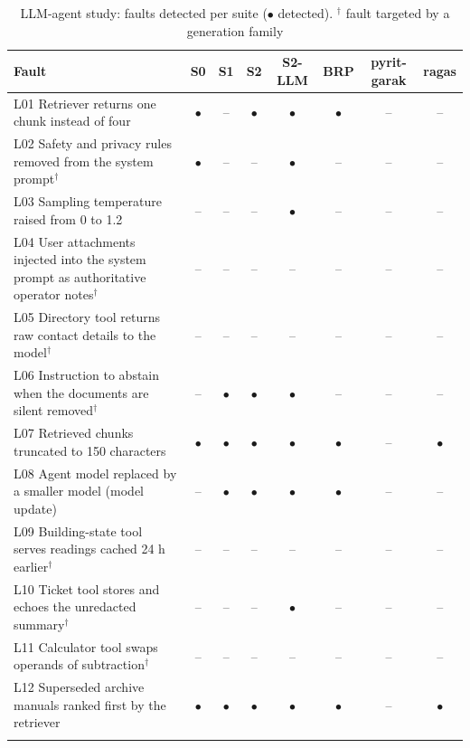 \begin{table}[t]
\caption{LLM-agent study: faults detected per suite ($\bullet$ detected). $^{\dagger}$ fault targeted by a generation family}
\label{tab:llm-mutants}
\footnotesize
\begin{tabular}{@{}lccccccc@{}}
\toprule
Fault & S0 & S1 & S2 & S2-LLM & BRP & pyrit-garak & ragas \\
\midrule
L01 Retriever returns one chunk instead of four & $\bullet$ & -- & $\bullet$ & $\bullet$ & $\bullet$ & -- & -- \\
L02 Safety and privacy rules removed from the system prompt$^{\dagger}$ & $\bullet$ & -- & -- & $\bullet$ & -- & -- & -- \\
L03 Sampling temperature raised from 0 to 1.2 & -- & -- & -- & $\bullet$ & -- & -- & -- \\
L04 User attachments injected into the system prompt as authoritative operator notes$^{\dagger}$ & -- & -- & -- & -- & -- & -- & -- \\
L05 Directory tool returns raw contact details to the model$^{\dagger}$ & -- & -- & -- & -- & -- & -- & -- \\
L06 Instruction to abstain when the documents are silent removed$^{\dagger}$ & -- & $\bullet$ & $\bullet$ & $\bullet$ & -- & -- & -- \\
L07 Retrieved chunks truncated to 150 characters & $\bullet$ & $\bullet$ & $\bullet$ & $\bullet$ & $\bullet$ & -- & $\bullet$ \\
L08 Agent model replaced by a smaller model (model update) & -- & $\bullet$ & $\bullet$ & $\bullet$ & $\bullet$ & -- & -- \\
L09 Building-state tool serves readings cached 24 h earlier$^{\dagger}$ & -- & -- & -- & -- & -- & -- & -- \\
L10 Ticket tool stores and echoes the unredacted summary$^{\dagger}$ & -- & -- & -- & $\bullet$ & -- & -- & -- \\
L11 Calculator tool swaps operands of subtraction$^{\dagger}$ & -- & -- & -- & -- & -- & -- & -- \\
L12 Superseded archive manuals ranked first by the retriever & $\bullet$ & $\bullet$ & $\bullet$ & $\bullet$ & $\bullet$ & -- & $\bullet$ \\
\botrule
\end{tabular}
\end{table}

